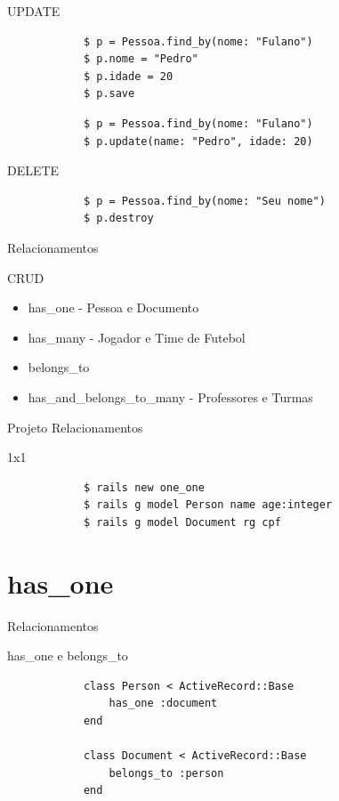 \documentclass{beamer}
\begin{document}
\begin{frame}[fragile]{UPDATE}
	\begin{block}{}
			\begin{verbatim}			
			$ p = Pessoa.find_by(nome: "Fulano")
			$ p.nome = "Pedro"
			$ p.idade = 20
			$ p.save
			\end{verbatim}
			\end{block}
			\begin{block}{}
			\begin{verbatim}
			$ p = Pessoa.find_by(nome: "Fulano")
			$ p.update(name: "Pedro", idade: 20)
			\end{verbatim}
			\end{block}
\end{frame}

\begin{frame}[fragile]{DELETE }
	\begin{block}{}
			\begin{verbatim}
			$ p = Pessoa.find_by(nome: "Seu nome")
			$ p.destroy
			\end{verbatim}
			\end{block}
\end{frame}

\begin{frame}{Relacionamentos}
	\begin{block} {\LARGE CRUD}
		\begin{itemize} \itemsep 2em
			\item{\LARGE has\_one - Pessoa e Documento}
			\item{\LARGE has\_many - Jogador e Time de Futebol}
			\item{\LARGE belongs\_to}
			\item{\LARGE has\_and\_belongs\_to\_many - Professores e Turmas}				
		\end{itemize}
	\end{block}
\end{frame}

\begin{frame}[fragile]{Projeto Relacionamentos}
	\begin{block} {1x1}
		\begin{verbatim}
		  	$ rails new one_one
		  	$ rails g model Person name age:integer
		  	$ rails g model Document rg cpf
		\end{verbatim}
	\end{block}
\end{frame}
\section{has\_one}
\begin{frame}[fragile]{Relacionamentos}
	\begin{block} {\LARGE has\_one e belongs\_to}
		\begin{verbatim}
		  	class Person < ActiveRecord::Base
		  	    has_one :document
		  	end
		  	
		  	class Document < ActiveRecord::Base
		  	    belongs_to :person
		  	end
		\end{verbatim}
	\end{block}
\end{frame}
\end{document}
